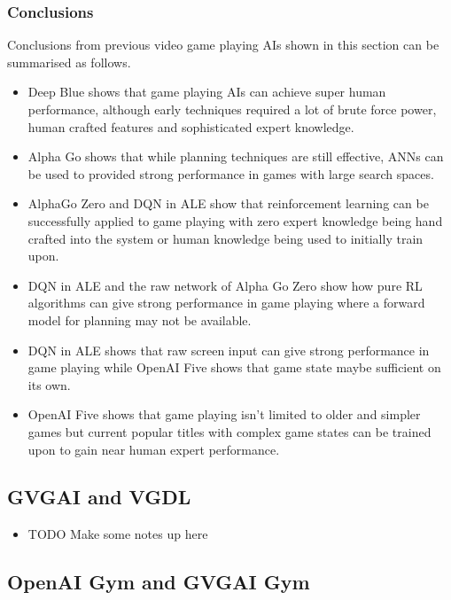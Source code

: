 \documentclass[a4paper]{article}
\begin{document}
\subsubsection{Conclusions}
Conclusions from previous video game playing AIs shown in this section can be summarised as follows.
\begin{itemize}[noitemsep,nolistsep]
    \item Deep Blue shows that game playing AIs can achieve super human performance, although early techniques required a lot of brute force power, human crafted features and sophisticated expert knowledge.
    \item Alpha Go shows that while planning techniques are still effective, ANNs can be used to provided strong performance in games with large search spaces.
    \item AlphaGo Zero and DQN in ALE show that reinforcement learning can be successfully applied to game playing with zero expert knowledge being hand crafted into the system or human knowledge being used to initially train upon.
    \item DQN in ALE and the raw network of Alpha Go Zero show how pure RL algorithms can give strong performance in game playing where a forward model for planning may not be available.
    \item DQN in ALE shows that raw screen input can give strong performance in game playing while OpenAI Five shows that game state maybe sufficient on its own.
    \item OpenAI Five shows that game playing isn't limited to older and simpler games but current popular titles with complex game states can be trained upon to gain near human expert performance.
\end{itemize}


\subsection{GVGAI and VGDL}
\begin{itemize}
    \item TODO Make some notes up here
\end{itemize}
\subsection{OpenAI Gym and GVGAI Gym}
\end{document}
